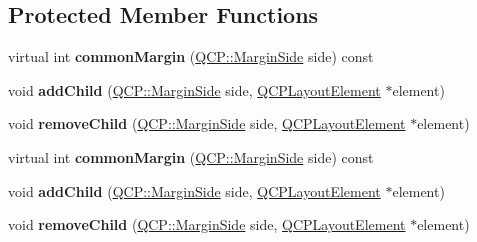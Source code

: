 \subsection*{Protected Member Functions}
\begin{DoxyCompactItemize}
\item 
virtual int {\bfseries common\+Margin} (\hyperlink{namespace_q_c_p_a7e487e3e2ccb62ab7771065bab7cae54}{Q\+C\+P\+::\+Margin\+Side} side) const \hypertarget{class_q_c_p_margin_group_aeaeba9068dba2ef8be41449f0f2582f7}{}\label{class_q_c_p_margin_group_aeaeba9068dba2ef8be41449f0f2582f7}

\item 
void {\bfseries add\+Child} (\hyperlink{namespace_q_c_p_a7e487e3e2ccb62ab7771065bab7cae54}{Q\+C\+P\+::\+Margin\+Side} side, \hyperlink{class_q_c_p_layout_element}{Q\+C\+P\+Layout\+Element} $\ast$element)\hypertarget{class_q_c_p_margin_group_acb9c3a35acec655c2895b7eb95ee0524}{}\label{class_q_c_p_margin_group_acb9c3a35acec655c2895b7eb95ee0524}

\item 
void {\bfseries remove\+Child} (\hyperlink{namespace_q_c_p_a7e487e3e2ccb62ab7771065bab7cae54}{Q\+C\+P\+::\+Margin\+Side} side, \hyperlink{class_q_c_p_layout_element}{Q\+C\+P\+Layout\+Element} $\ast$element)\hypertarget{class_q_c_p_margin_group_a20ab3286062957d99b58db683fe725b0}{}\label{class_q_c_p_margin_group_a20ab3286062957d99b58db683fe725b0}

\item 
virtual int {\bfseries common\+Margin} (\hyperlink{namespace_q_c_p_a7e487e3e2ccb62ab7771065bab7cae54}{Q\+C\+P\+::\+Margin\+Side} side) const \hypertarget{class_q_c_p_margin_group_ad55a5a69f11ae2539e6a2967c1a213d1}{}\label{class_q_c_p_margin_group_ad55a5a69f11ae2539e6a2967c1a213d1}

\item 
void {\bfseries add\+Child} (\hyperlink{namespace_q_c_p_a7e487e3e2ccb62ab7771065bab7cae54}{Q\+C\+P\+::\+Margin\+Side} side, \hyperlink{class_q_c_p_layout_element}{Q\+C\+P\+Layout\+Element} $\ast$element)\hypertarget{class_q_c_p_margin_group_acb9c3a35acec655c2895b7eb95ee0524}{}\label{class_q_c_p_margin_group_acb9c3a35acec655c2895b7eb95ee0524}

\item 
void {\bfseries remove\+Child} (\hyperlink{namespace_q_c_p_a7e487e3e2ccb62ab7771065bab7cae54}{Q\+C\+P\+::\+Margin\+Side} side, \hyperlink{class_q_c_p_layout_element}{Q\+C\+P\+Layout\+Element} $\ast$element)\hypertarget{class_q_c_p_margin_group_a20ab3286062957d99b58db683fe725b0}{}\label{class_q_c_p_margin_group_a20ab3286062957d99b58db683fe725b0}

\end{DoxyCompactItemize}
